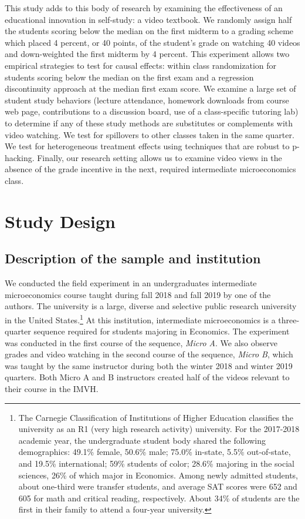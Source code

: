 \documentclass[12pt]{article}
\begin{document}
This study adds to this body of research by examining the effectiveness of an educational innovation in self-study: a video textbook. We randomly assign half the students scoring below the median on the first midterm to a grading scheme which placed 4 percent, or 40 points, of the student's grade on watching 40 videos and down-weighted the first midterm by 4 percent. This experiment allows two empirical strategies to test for causal effects: within class randomization for students scoring below the median on the first exam and a regression discontinuity approach at the median first exam score. We examine a large set of student study behaviors (lecture attendance, homework downloads from course web page, contributions to a discussion board, use of a class-specific tutoring lab) to determine if any of these study methods are substitutes or complements with video watching. We test for spillovers to other classes taken in the same quarter. We test for heterogeneous treatment effects using techniques that are robust to p-hacking. Finally, our research setting allows us to examine video views in the absence of the grade incentive in the next, required intermediate microeconomics class.


\section{Study Design} \label{studydesign}

\subsection{Description of the sample and institution}

We conducted the field experiment in an undergraduates intermediate microeconomics course taught during fall 2018 and fall 2019 by one of the authors. The university is a large, diverse and selective public research university in the United States.\footnote{The Carnegie Classification of Institutions of Higher Education classifies the university as an R1 (very high research activity) university. For the 2017-2018 academic year, the undergraduate student body shared the following demographics: 49.1\% female, 50.6\% male; 75.0\% in-state, 5.5\% out-of-state, and 19.5\% international; 59\% students of color; 28.6\% majoring in the social sciences, 26\% of which major in Economics. Among newly admitted students, about one-third were transfer students, and average SAT scores were 652 and 605 for math and critical reading, respectively. About 34\% of students are the first in their family to attend a four-year university.} At this institution, intermediate microeconomics is a three-quarter sequence required for students majoring in Economics. The experiment was conducted in the first course of the sequence, \textit{Micro A}. We also observe grades and video watching in the second course of the sequence, \textit{Micro B}, which was taught by the same instructor during both the winter 2018 and winter 2019 quarters. Both Micro A and B instructors created half of the videos relevant to their course in the IMVH.
\end{document}
